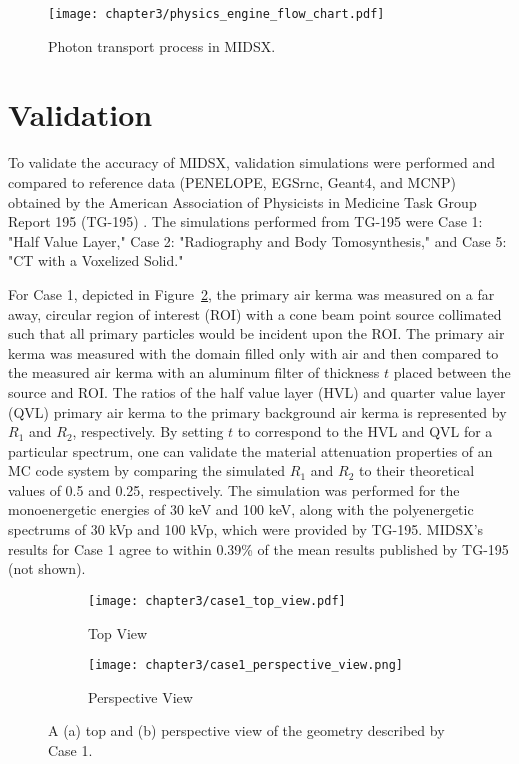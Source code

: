 \begin{figure}[H]
    \centering
	\texttt{[image: chapter3/physics\_engine\_flow\_chart.pdf]}
	\caption{Photon transport process in MIDSX.}
	\label{fig:PhysicsEngineFlowChart}
\end{figure}

\section{Validation}
\par To validate the accuracy of MIDSX, validation simulations were performed and compared to reference data (PENELOPE, EGSrnc, Geant4, and MCNP) obtained by the American Association of Physicists in Medicine Task Group Report 195 (TG-195) \cite{sechopoulos_monte_2015}. The simulations performed from TG-195 were Case 1: "Half Value Layer," Case 2: "Radiography and Body Tomosynthesis," and Case 5: "CT with a Voxelized Solid." 

\par For Case 1, depicted in Figure~\ref{fig:case1}, the primary air kerma was measured on a far away, circular region of interest (ROI) with a cone beam point source collimated such that all primary particles would be incident upon the ROI. The primary air kerma was measured with the domain filled only with air and then compared to the measured air kerma with an aluminum filter of thickness $t$ placed between the source and ROI. The ratios of the half value layer (HVL) and quarter value layer (QVL) primary air kerma to the primary background air kerma is represented by $R_1$ and $R_2$, respectively. By setting $t$ to correspond to the HVL and QVL for a particular spectrum, one can validate the material attenuation properties of an MC code system by comparing the simulated $R_1$ and $R_2$ to their theoretical values of 0.5 and 0.25, respectively. The simulation was performed for the monoenergetic energies of 30 keV and 100 keV, along with the polyenergetic spectrums of 30 kVp and 100 kVp, which were provided by TG-195. MIDSX's results for Case 1 agree to within 0.39\% of the mean results published by TG-195 (not shown).

\begin{figure}[H]
    \centering
    \begin{subfigure}[l]{\textwidth}
        \texttt{[image: chapter3/case1\_top\_view.pdf]}
        \caption{Top View}
    \end{subfigure}
    \hfill %
    \begin{subfigure}[l]{\textwidth}
        \texttt{[image: chapter3/case1\_perspective\_view.png]}
        \caption{Perspective View}
    \end{subfigure}
    \caption{A (a) top and (b) perspective view of the geometry described by Case 1.}
    \label{fig:case1}
\end{figure}

